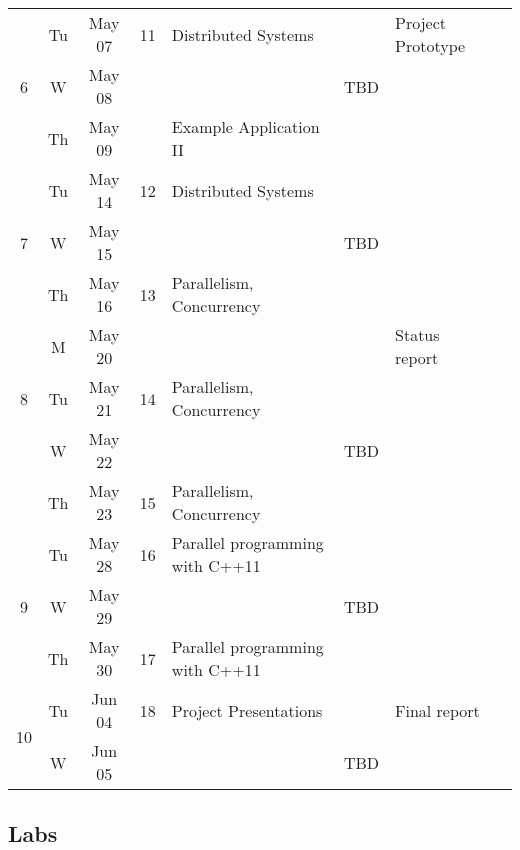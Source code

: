 \documentclass[11pt]{article}
\newcommand{\emptycell}{\cellcolor[gray]{0.9}}
\begin{document}
\begin{landscape}
\begin{longtable}{|c|cc|c|p{7cm}|p{6cm}|p{2cm}|c|}
\multirow{3}{*}{6} 	& Tu & May 07 	& 11 		& Distributed Systems		& \emptycell  	& Project \mbox{Prototype}\\ \cline{ 2- 8}
			& W & May 08	& \emptycell 	& \emptycell			& TBD	 	& \emptycell \\ \cline{ 2- 8}
			& Th & May 09 	& \emptycell	& Example Application II  	& \emptycell    & \emptycell \\ \hline\hline

\multirow{3}{*}{7} 	& Tu & May 14 	& 12 		& Distributed Systems		& \emptycell  	& \emptycell \\ \cline{ 2- 8}
			& W & May 15	& \emptycell 	& \emptycell			& TBD	 	& \emptycell \\ \cline{ 2- 8}
			& Th & May 16 	& 13 		& Parallelism, Concurrency 	& \emptycell  	& \emptycell \\ \hline\hline

\multirow{3}{*}{8}	& M & May 20 	& \emptycell	& \emptycell    		& \emptycell  	& Status report \\ \cline{ 2- 8}
			& Tu & May 21 	& 14 		& Parallelism, Concurrency	& \emptycell  	& \emptycell \\ \cline{ 2- 8}
			& W & May 22	& \emptycell 	& \emptycell			& TBD	 	& \emptycell \\ \cline{ 2- 8}
			& Th & May 23 	& 15 		& Parallelism, Concurrency 	& \emptycell  	& \emptycell \\ \hline\hline

\multirow{3}{*}{9} 	& Tu & May 28 	& 16 		& Parallel programming with C++11		& \emptycell &  \emptycell  	 \\ \cline{ 2- 8}
			& W & May 29	& \emptycell 	& \emptycell			& TBD	 	& \emptycell \\ \cline{ 2- 8}
			& Th & May 30 	& 17 		& Parallel programming with C++11	 	& \emptycell  	& \emptycell \\ \hline\hline

\multirow{3}{*}{10} 	& Tu & Jun 04 	& 18 		& Project Presentations		& \emptycell  	& Final report \\ \cline{ 2- 8}
			& W & Jun 05	& \emptycell 	& \emptycell			& TBD	 	& \emptycell \\ \cline{ 2- 8}

\end{longtable}

\end{landscape}



\subsection{Labs}
\end{document}
